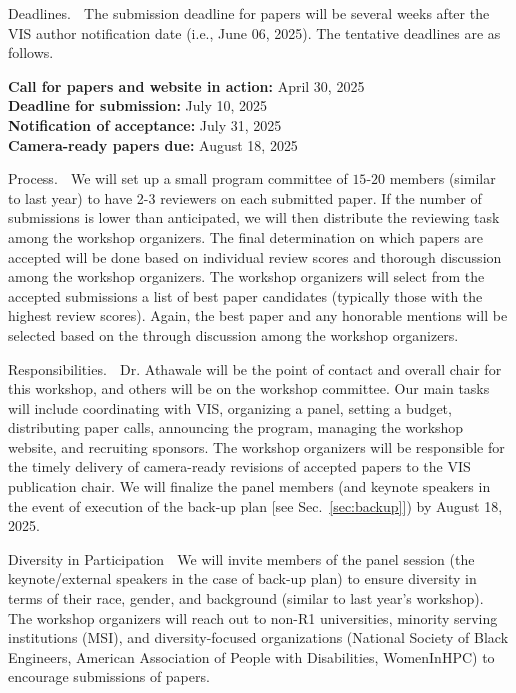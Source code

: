 {\large Deadlines.} $\;$ The submission deadline for papers will be several weeks after the VIS author notification date (i.e., June 06, 2025). The tentative deadlines are as follows.

\vspace{2pt}
\indent\indent\textbf{Call for papers and website in action:} April 30, 2025\\
\indent\indent\textbf{Deadline for submission:} July 10, 2025 \\
\indent\indent\textbf{Notification of acceptance:} July 31, 2025 \\
\indent\indent\textbf{Camera-ready papers due:} August 18, 2025 
%

\vspace{2pt}
{\large Process.} $\;$ We will set up a small program committee of $15$-$20$ members (similar to last year) to have 2-3 reviewers on each submitted paper. If the number of submissions is lower than anticipated, we will then distribute the reviewing task among the workshop organizers. The final determination on which papers are accepted will be done based on individual review scores and thorough discussion among the workshop organizers. The workshop organizers will select from the accepted submissions a list of best paper candidates (typically those with the highest review scores). Again, the best paper and any honorable mentions will be selected based on the through discussion among the workshop organizers.
%

{\large Responsibilities.} $\;$ Dr. Athawale will be the point of contact and overall chair for this workshop, and others will be on the workshop committee. Our main tasks will include coordinating with VIS, organizing a panel, setting a budget, distributing paper calls, announcing the program, managing the workshop website, and recruiting sponsors. The workshop organizers will be responsible for the timely delivery of camera-ready revisions of accepted papers to the VIS publication chair. We will finalize the panel members (and keynote speakers in the event of execution of the back-up plan [see Sec.~\ref{sec:backup}]) by August 18, 2025. 

{\large Diversity in Participation} $\;$ We will invite members of the panel session (the keynote/external speakers in the case of back-up plan) to ensure diversity in terms of their race, gender, and background (similar to last year's workshop). The workshop organizers will reach out to non-R1 universities, minority serving institutions (MSI), and diversity-focused organizations (National Society of Black Engineers, American Association of People with Disabilities, WomenInHPC) to encourage submissions of papers.  


